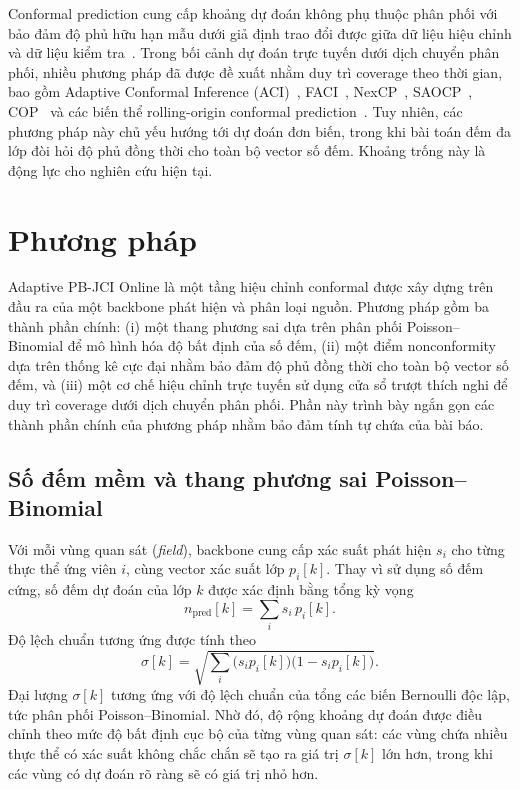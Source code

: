 \documentclass[pdflatex,sn-mathphys-num]{sn-jnl}
\begin{document}
Conformal prediction cung cấp khoảng dự đoán không phụ thuộc phân phối với bảo đảm độ phủ hữu hạn mẫu dưới
giả định trao đổi được giữa dữ liệu hiệu chỉnh và dữ liệu kiểm tra~\cite{vovk2005algorithmic}. Trong bối
cảnh dự đoán trực tuyến dưới dịch chuyển phân phối, nhiều phương pháp đã được đề xuất nhằm duy trì coverage
theo thời gian, bao gồm Adaptive Conformal Inference (ACI)~\cite{gibbs2021adaptive},
FACI~\cite{gibbs2024conformal}, NexCP~\cite{barber2023conformal}, SAOCP~\cite{bhatnagar2023improved},
COP~\cite{hu2026conformal} và các biến thể rolling-origin conformal prediction~\cite{halkiewicz2026rolling}.
Tuy nhiên, các phương pháp này chủ yếu hướng tới dự đoán đơn biến, trong khi bài toán đếm đa lớp đòi hỏi độ
phủ đồng thời cho toàn bộ vector số đếm. Khoảng trống này là động lực cho nghiên cứu hiện tại.

\section{Phương pháp}\label{sec:method}

Adaptive PB-JCI Online là một tầng hiệu chỉnh conformal được xây dựng trên đầu ra của một backbone phát hiện
và phân loại nguồn. Phương pháp gồm ba thành phần chính: (i) một thang phương sai dựa trên phân phối
Poisson--Binomial để mô hình hóa độ bất định của số đếm, (ii) một điểm nonconformity dựa trên thống kê cực
đại nhằm bảo đảm độ phủ đồng thời cho toàn bộ vector số đếm, và (iii) một cơ chế hiệu chỉnh trực tuyến sử
dụng cửa sổ trượt thích nghi để duy trì coverage dưới dịch chuyển phân phối. Phần này trình bày ngắn gọn các
thành phần chính của phương pháp nhằm bảo đảm tính tự chứa của bài báo.

\subsection{Số đếm mềm và thang phương sai Poisson--Binomial}
Với mỗi vùng quan sát (\emph{field}), backbone cung cấp xác suất phát hiện $s_i$ cho từng thực thể ứng viên
$i$, cùng vector xác suất lớp $p_i[k]$. Thay vì sử dụng số đếm cứng, số đếm dự đoán của lớp $k$ được xác định
bằng tổng kỳ vọng
\[
n_{\mathrm{pred}}[k]=\sum_i s_i\,p_i[k].
\]
Độ lệch chuẩn tương ứng được tính theo
\begin{equation}
\sigma[k]=\sqrt{\sum_i \big(s_i p_i[k]\big)\big(1-s_i p_i[k]\big)}. \label{eq:soft}
\end{equation}
Đại lượng $\sigma[k]$ tương ứng với độ lệch chuẩn của tổng các biến Bernoulli độc lập, tức phân phối
Poisson--Binomial. Nhờ đó, độ rộng khoảng dự đoán được điều chỉnh theo mức độ bất định cục bộ của từng vùng
quan sát: các vùng chứa nhiều thực thể có xác suất không chắc chắn sẽ tạo ra giá trị $\sigma[k]$ lớn hơn,
trong khi các vùng có dự đoán rõ ràng sẽ có giá trị nhỏ hơn.
\end{document}
